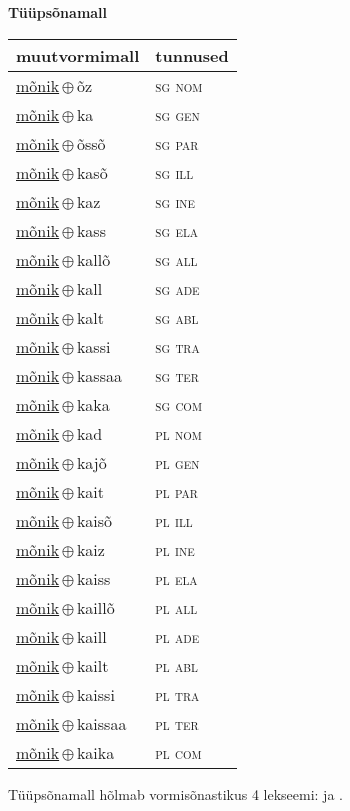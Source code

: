 

\vspace{3.5em}
\noindent \begin{minipage}{\textwidth}
\noindent \textbf{Tüüpsõnamall \,}\\

\begin{sideways}
\begin{tabular}{l l}
muutvormimall & tunnused \\
\hline
\underline{mõnik}\,$\oplus$\,õz & \textsc{ sg nom } \\
\underline{mõnik}\,$\oplus$\,ka & \textsc{ sg gen } \\
\underline{mõnik}\,$\oplus$\,õssõ & \textsc{ sg par } \\
\underline{mõnik}\,$\oplus$\,kasõ & \textsc{ sg ill } \\
\underline{mõnik}\,$\oplus$\,kaz & \textsc{ sg ine } \\
\underline{mõnik}\,$\oplus$\,kass & \textsc{ sg ela } \\
\underline{mõnik}\,$\oplus$\,kallõ & \textsc{ sg all } \\
\underline{mõnik}\,$\oplus$\,kall & \textsc{ sg ade } \\
\underline{mõnik}\,$\oplus$\,kalt & \textsc{ sg abl } \\
\underline{mõnik}\,$\oplus$\,kassi & \textsc{ sg tra } \\
\underline{mõnik}\,$\oplus$\,kassaa & \textsc{ sg ter } \\
\underline{mõnik}\,$\oplus$\,kaka & \textsc{ sg com } \\
\underline{mõnik}\,$\oplus$\,kad & \textsc{ pl nom } \\
\underline{mõnik}\,$\oplus$\,kajõ & \textsc{ pl gen } \\
\underline{mõnik}\,$\oplus$\,kait & \textsc{ pl par } \\
\underline{mõnik}\,$\oplus$\,kaisõ & \textsc{ pl ill } \\
\underline{mõnik}\,$\oplus$\,kaiz & \textsc{ pl ine } \\
\underline{mõnik}\,$\oplus$\,kaiss & \textsc{ pl ela } \\
\underline{mõnik}\,$\oplus$\,kaillõ & \textsc{ pl all } \\
\underline{mõnik}\,$\oplus$\,kaill & \textsc{ pl ade } \\
\underline{mõnik}\,$\oplus$\,kailt & \textsc{ pl abl } \\
\underline{mõnik}\,$\oplus$\,kaissi & \textsc{ pl tra } \\
\underline{mõnik}\,$\oplus$\,kaissaa & \textsc{ pl ter } \\
\underline{mõnik}\,$\oplus$\,kaika & \textsc{ pl com } \\
\end{tabular}
\end{sideways}
\label{tab:tüüpsõnamall-mõnikõz}

\end{minipage}

 
\vspace{1em}
\noindent Tüüpsõnamall  hõlmab vormisõnastikus 4 lekseemi:  ja .
